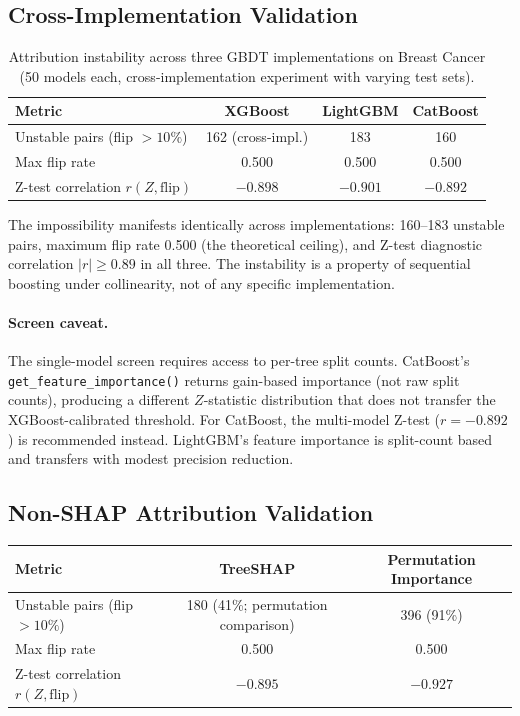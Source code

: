 \documentclass{article}
\begin{document}
\subsection{Cross-Implementation Validation}

\begin{table}[t]
\centering
\caption{Attribution instability across three GBDT implementations on Breast Cancer (50 models each, cross-implementation experiment with varying test sets).}
\label{tab:cross-impl}
\small
\begin{tabular}{@{}lccc@{}}
\toprule
Metric & XGBoost & LightGBM & CatBoost \\
\midrule
Unstable pairs (flip $> 10\%$) & 162 (cross-impl.) & 183 & 160 \\
Max flip rate & 0.500 & 0.500 & 0.500 \\
Z-test correlation $r(Z, \text{flip})$ & $-0.898$ & $-0.901$ & $-0.892$ \\
\bottomrule
\end{tabular}
\end{table}

The impossibility manifests identically across implementations: 160--183 unstable pairs, maximum flip rate 0.500 (the theoretical ceiling), and Z-test diagnostic correlation $|r| \geq 0.89$ in all three. The instability is a property of sequential boosting under collinearity, not of any specific implementation.

\paragraph{Screen caveat.}
\begin{sloppypar}
The single-model screen requires access to per-tree split counts.
CatBoost's \texttt{get\_feature\_importance()} returns gain-based importance
(not raw split counts), producing a different $Z$-statistic distribution that
does not transfer the XGBoost-calibrated threshold. For CatBoost, the multi-model
Z-test ($r = -0.892$) is recommended instead. LightGBM's feature
importance is split-count based and transfers with modest precision reduction.
\end{sloppypar}

\subsection{Non-SHAP Attribution Validation}

\begin{center}
\small
\begin{tabular}{@{}lcc@{}}
\toprule
Metric & TreeSHAP & Permutation Importance \\
\midrule
Unstable pairs (flip $>10\%$) & 180 (41\%; permutation comparison) & 396 (91\%) \\
Max flip rate & 0.500 & 0.500 \\
Z-test correlation $r(Z, \text{flip})$ & $-0.895$ & $-0.927$ \\
\bottomrule
\end{tabular}
\end{center}
\end{document}

